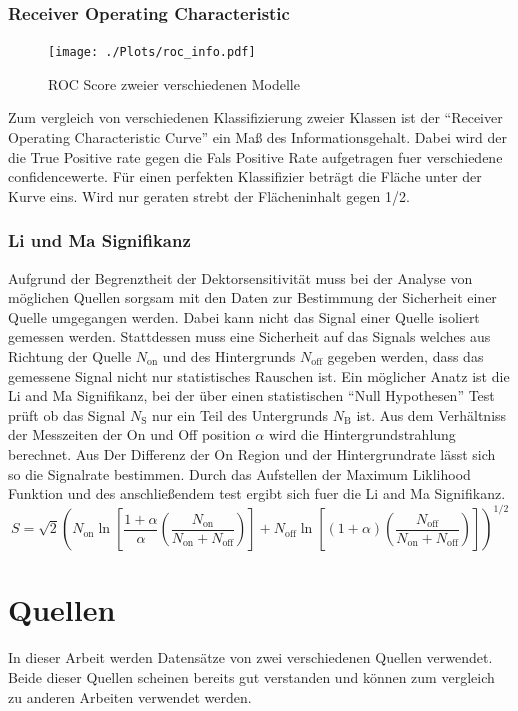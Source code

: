 \subsection{Receiver Operating Characteristic}
\begin{figure}
  \centering
  \texttt{[image: ./Plots/roc\_info.pdf]}
  \caption{ROC Score zweier verschiedenen Modelle}
\end{figure}
Zum vergleich von verschiedenen Klassifizierung zweier Klassen ist der ``Receiver Operating Characteristic Curve'' ein Maß des Informationsgehalt. 
Dabei wird der die True Positive rate gegen die Fals Positive Rate aufgetragen fuer verschiedene confidencewerte. 
Für einen perfekten Klassifizier beträgt die Fläche unter der Kurve eins. 
Wird nur geraten strebt der Flächeninhalt gegen 1/2.
\subsection{Li und Ma Signifikanz}
Aufgrund der Begrenztheit der Dektorsensitivität muss bei der Analyse von möglichen Quellen sorgsam mit den Daten zur Bestimmung der Sicherheit einer Quelle umgegangen werden.
Dabei kann nicht das Signal einer Quelle isoliert gemessen werden. 
Stattdessen muss eine Sicherheit auf das Signals welches aus Richtung der Quelle $N_\text{on}$ und des Hintergrunds $N_\text{off}$ gegeben werden, dass das gemessene Signal nicht nur statistisches Rauschen ist.
Ein möglicher Anatz ist die Li and Ma Signifikanz, bei der über einen statistischen ``Null Hypothesen'' Test prüft ob das Signal $N_\text{S}$ nur ein Teil des Untergrunds $N_\text{B}$ ist. 
Aus dem Verhältniss der Messzeiten der On und Off position $\alpha$ wird die Hintergrundstrahlung berechnet. 
Aus Der Differenz der On Region und der Hintergrundrate lässt sich so die Signalrate bestimmen. 
Durch das Aufstellen der Maximum Liklihood Funktion und des anschließendem test ergibt sich fuer die Li and Ma Signifikanz.
\begin{equation}
S = \sqrt{2} \left( N_\text{on} \ln \left[ \frac{1+ \alpha}{\alpha}\left( \frac{N_\text{on}}{N_\text{on} + N_\text{off}} \right) \right] + N_\text{off} \ln \left[ \left( 1+ \alpha \right) \left( \frac{N_\text{off}}{N_\text{on} + N_\text{off}} \right) \right] \right)^{1/2}
\end{equation}

\chapter{Quellen}
In dieser Arbeit werden Datensätze von zwei verschiedenen Quellen verwendet. 
Beide dieser Quellen scheinen bereits gut verstanden und können zum vergleich zu anderen Arbeiten verwendet werden.
